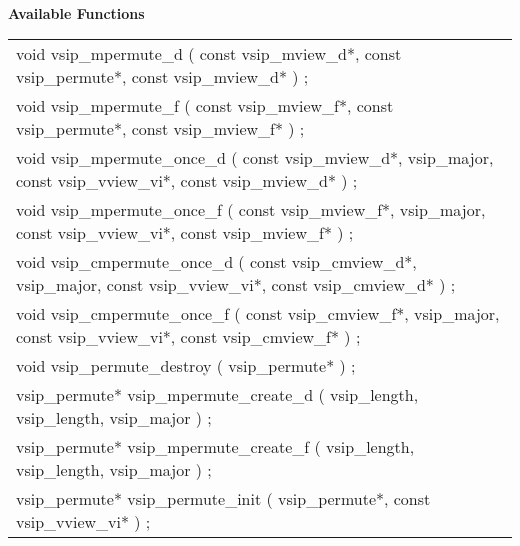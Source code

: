 \\\cvsiplh
\newline \hspace*{.8cm} \vspace*{.1cm} \textbf{Available Functions }
\newline \hspace*{1.1cm} {
\ttfamily
\begin{tabular}[H]{l}
void vsip\_mpermute\_d ( const vsip\_mview\_d*, const vsip\_permute*, const vsip\_mview\_d* ) ;\\
void vsip\_mpermute\_f ( const vsip\_mview\_f*, const vsip\_permute*, const vsip\_mview\_f* ) ;\\
void vsip\_mpermute\_once\_d ( const vsip\_mview\_d*, vsip\_major, const vsip\_vview\_vi*, const vsip\_mview\_d* ) ;\\
void vsip\_mpermute\_once\_f ( const vsip\_mview\_f*, vsip\_major, const vsip\_vview\_vi*, const vsip\_mview\_f* ) ;\\
void vsip\_cmpermute\_once\_d ( const vsip\_cmview\_d*, vsip\_major, const vsip\_vview\_vi*, const vsip\_cmview\_d* ) ;\\
void vsip\_cmpermute\_once\_f ( const vsip\_cmview\_f*, vsip\_major, const vsip\_vview\_vi*, const vsip\_cmview\_f* ) ;\\
void vsip\_permute\_destroy ( vsip\_permute* ) ;\\
vsip\_permute* vsip\_mpermute\_create\_d ( vsip\_length, vsip\_length, vsip\_major ) ;\\
vsip\_permute* vsip\_mpermute\_create\_f ( vsip\_length, vsip\_length, vsip\_major ) ;\\
vsip\_permute* vsip\_permute\_init ( vsip\_permute*, const vsip\_vview\_vi* ) ;\\
\end{tabular}
}\\
\\\pyjvsiph
{}
